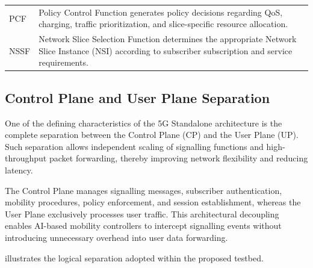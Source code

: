 \documentclass[12pt,a4paper]{article}\usepackage[a4paper,margin=1in]{geometry}\usepackage{graphicx}\usepackage{longtable}\usepackage{booktabs}\usepackage{hyperref}\usepackage{enumitem}\usepackage{amsmath}\usepackage{tikz}\usepackage{pgfgantt}\usepackage{setspace}\setstretch{1.15}\usetikzlibrary{positioning,arrows.meta,shapes.geometric}
\begin{document}
\begin{table}[h]
\begin{tabular}{p{3.2cm}p{10.2cm}}
			PCF &
			Policy Control Function generates policy decisions regarding QoS, charging, traffic prioritization, and slice-specific resource allocation. \\
			
			NSSF &
			Network Slice Selection Function determines the appropriate Network Slice Instance (NSI) according to subscriber subscription and service requirements. \\
			
			\bottomrule
		\end{tabular}
		
	\end{table}
	
	\vspace{0.4cm}
	
	\subsection{Control Plane and User Plane Separation}
	
	One of the defining characteristics of the 5G Standalone architecture is the complete separation between the Control Plane (CP) and the User Plane (UP). Such separation allows independent scaling of signalling functions and high-throughput packet forwarding, thereby improving network flexibility and reducing latency.
	
	The Control Plane manages signalling messages, subscriber authentication, mobility procedures, policy enforcement, and session establishment, whereas the User Plane exclusively processes user traffic. This architectural decoupling enables AI-based mobility controllers to intercept signalling events without introducing unnecessary overhead into user data forwarding.
	
	 illustrates the logical separation adopted within the proposed testbed.
	
\end{document}
